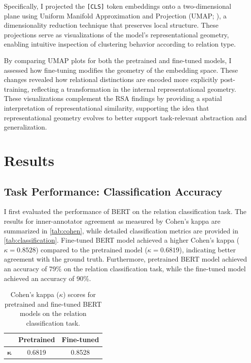 \documentclass[stu,floatsintext]{apa7}
\begin{document}
Specifically, I projected the \texttt{[CLS]} token embeddings onto a two-dimensional plane using Uniform Manifold Approximation and Projection (UMAP; \cite{https://doi.org/10.48550/arxiv.1802.03426}), a dimensionality reduction technique that preserves local structure. These projections serve as visualizations of the model’s representational geometry, enabling intuitive inspection of clustering behavior according to relation type.

By comparing UMAP plots for both the pretrained and fine-tuned models, I assessed how fine-tuning modifies the geometry of the embedding space. These changes revealed how relational distinctions are encoded more explicitly post-training, reflecting a transformation in the internal representational geometry. These visualizations complement the RSA findings by providing a spatial interpretation of representational similarity, supporting the idea that representational geometry evolves to better support task-relevant abstraction and generalization.

\section{Results}

\subsection{Task Performance: Classification Accuracy}

I first evaluated the performance of BERT on the relation classification task. The results for inner-annotator agreement as measured by Cohen's kappa are summarized in \autoref{tab:cohen}, while detailed classification metrics are provided in \autoref{tab:classification}. Fine-tuned BERT model achieved a higher Cohen's kappa ($\kappa = 0.8528$) compared to the pretrained model ($\kappa = 0.6819$), indicating better agreement with the ground truth. Furthermore, pretrained BERT model achieved an accuracy of 79\% on the relation classification task, while the fine-tuned model achieved an accuracy of 90\%.

\medskip
\begin{table}[h]
  \centering
  \caption{Cohen's kappa ($\kappa$) scores for pretrained and fine-tuned BERT models on the relation classification task.}
  \label{tab:cohen}
  \begin{tabular}{|c|c|c|}
    \hline
    & \textbf{Pretrained} & \textbf{Fine-tuned} \\
    \hline
    \textbf{$\mathbf{\kappa}$} & 0.6819 & 0.8528 \\
    \hline
  \end{tabular}
\end{table}
\end{document}
